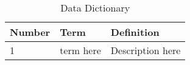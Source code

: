 \begin{table}[!h]
    \caption{Data Dictionary}
        \label{tab:Table1}
        \begin{tabular}{l|p{2cm}|p{10cm}}
            \textbf{Number} & \textbf{Term} & \textbf{Definition}\\
            \hline 1 & term here & Description here \\
        \end{tabular}
      \end{table}